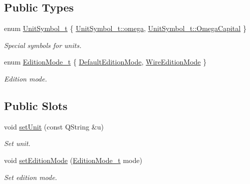 \subsection*{Public Types}
\begin{DoxyCompactItemize}
\item 
enum \hyperlink{classmdt_double_edit_a29d81fa03124e501a6162b5ea018cdb8}{Unit\-Symbol\-\_\-t} \{ \hyperlink{classmdt_double_edit_a29d81fa03124e501a6162b5ea018cdb8ac6d6bd7ebf806f43c76acc3681703b81}{Unit\-Symbol\-\_\-t\-::omega}, 
\hyperlink{classmdt_double_edit_a29d81fa03124e501a6162b5ea018cdb8aba196d25e527b3d00f4af5bc7a013572}{Unit\-Symbol\-\_\-t\-::\-Omega\-Capital}
 \}
\begin{DoxyCompactList}\small\item\em Special symbols for units. \end{DoxyCompactList}\item 
enum \hyperlink{classmdt_double_edit_a52cc3f5b9d6acd6838c52d478b3ea4dd}{Edition\-Mode\-\_\-t} \{ \hyperlink{classmdt_double_edit_a52cc3f5b9d6acd6838c52d478b3ea4dda4910df3bf542ccbaadc53e42150a0e00}{Default\-Edition\-Mode}, 
\hyperlink{classmdt_double_edit_a52cc3f5b9d6acd6838c52d478b3ea4dda26278c3ed551b8412c6f52d97604e2fe}{Wire\-Edition\-Mode}
 \}
\begin{DoxyCompactList}\small\item\em Edition mode. \end{DoxyCompactList}\end{DoxyCompactItemize}
\subsection*{Public Slots}
\begin{DoxyCompactItemize}
\item 
void \hyperlink{classmdt_double_edit_a3eb1b0434235fae23fa3f795fb90066e}{set\-Unit} (const Q\-String \&u)
\begin{DoxyCompactList}\small\item\em Set unit. \end{DoxyCompactList}\item 
void \hyperlink{classmdt_double_edit_aca9eebfc6e8a57be1b0c7f3a7b1a1e45}{set\-Edition\-Mode} (\hyperlink{classmdt_double_edit_a52cc3f5b9d6acd6838c52d478b3ea4dd}{Edition\-Mode\-\_\-t} mode)
\begin{DoxyCompactList}\small\item\em Set edition mode. \end{DoxyCompactList}\end{DoxyCompactItemize}
